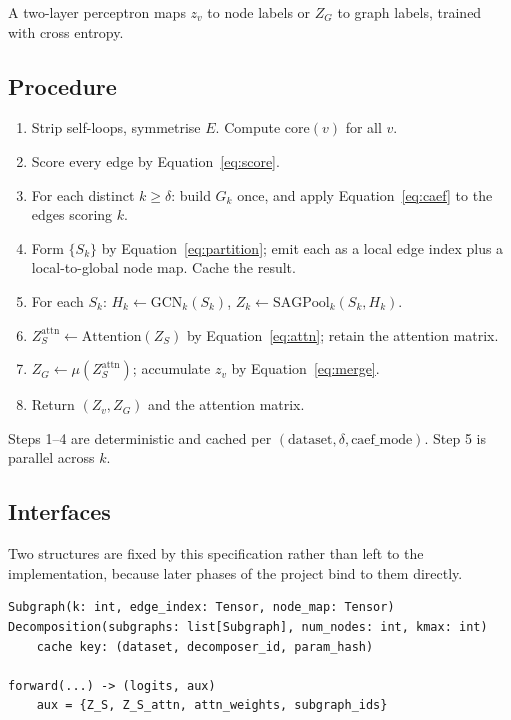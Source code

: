 \documentclass[11pt,a4paper]{article}
\begin{document}
A two-layer perceptron maps $z_v$ to node labels or $Z_G$ to graph labels, trained with cross
entropy.

\subsection{Procedure}

\noindent\hrulefill
\begin{enumerate}\setlength{\itemsep}{0pt}
\item Strip self-loops, symmetrise $E$. Compute $\mathrm{core}(v)$ for all $v$.
\item Score every edge by Equation~\eqref{eq:score}.
\item For each distinct $k \geq \delta$: build $G_k$ once, and apply Equation~\eqref{eq:caef} to the
      edges scoring $k$.
\item Form $\{S_k\}$ by Equation~\eqref{eq:partition}; emit each as a local edge index plus a
      local-to-global node map. Cache the result.
\item For each $S_k$: $H_k \leftarrow \mathrm{GCN}_k(S_k)$, $Z_k \leftarrow
      \mathrm{SAGPool}_k(S_k, H_k)$.
\item $Z_S^{\mathrm{attn}} \leftarrow \mathrm{Attention}(Z_S)$ by Equation~\eqref{eq:attn}; retain
      the attention matrix.
\item $Z_G \leftarrow \mu(Z_S^{\mathrm{attn}})$; accumulate $z_v$ by Equation~\eqref{eq:merge}.
\item Return $(Z_v, Z_G)$ and the attention matrix.
\end{enumerate}
\noindent\hrulefill

\medskip
Steps 1--4 are deterministic and cached per $(\textrm{dataset}, \delta, \textrm{caef\_mode})$.
Step 5 is parallel across $k$.

\subsection{Interfaces}
\label{sec:interfaces}

Two structures are fixed by this specification rather than left to the implementation, because
later phases of the project bind to them directly.

\begin{small}
\begin{verbatim}
Subgraph(k: int, edge_index: Tensor, node_map: Tensor)
Decomposition(subgraphs: list[Subgraph], num_nodes: int, kmax: int)
    cache key: (dataset, decomposer_id, param_hash)

forward(...) -> (logits, aux)
    aux = {Z_S, Z_S_attn, attn_weights, subgraph_ids}
\end{verbatim}
\end{small}
\end{document}
